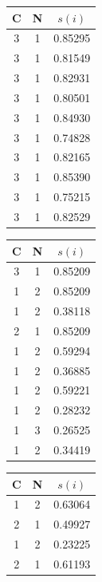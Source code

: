 \documentclass[a4paper, 12pt]{report}
\begin{document}
			\begin{table}
				\centering
				\begin{minipage}{0.3\textwidth}
					\begin{tabular}{c c c}
						\hline
						\textbf{C} & \textbf{N} & $s(i)$ \\
						\hline
						3 & 1 & 0.85295 \\
						3 & 1 & 0.81549 \\
						3 & 1 & 0.82931 \\
						3 & 1 & 0.80501 \\
						3 & 1 & 0.84930 \\
						3 & 1 & 0.74828 \\
						3 & 1 & 0.82165 \\
						3 & 1 & 0.85390 \\
						3 & 1 & 0.75215 \\
						3 & 1 & 0.82529 \\
						\hline
					\end{tabular}
				\end{minipage}
				\begin{minipage}{0.3\textwidth}
					\begin{tabular}{c c c}
						\hline
						\textbf{C} & \textbf{N} & $s(i)$ \\
						\hline
						3 & 1 & 0.85209 \\
						1 & 2 & 0.85209 \\
						1 & 2 & 0.38118 \\
						2 & 1 & 0.85209 \\
						1 & 2 & 0.59294 \\
						1 & 2 & 0.36885 \\
						1 & 2 & 0.59221 \\
						1 & 2 & 0.28232 \\
						1 & 3 & 0.26525 \\
						1 & 2 & 0.34419 \\
						\hline
					\end{tabular}
				\end{minipage}
				\begin{minipage}{0.3\textwidth}
					\begin{tabular}{c c c}
						\hline
						\textbf{C} & \textbf{N} & $s(i)$ \\
						\hline
						1 & 2 & 0.63064 \\
						2 & 1 & 0.49927 \\
						1 & 2 & 0.23225 \\
						2 & 1 & 0.61193 \\

\end{tabular}
\end{minipage}
\end{table}
\end{document}
